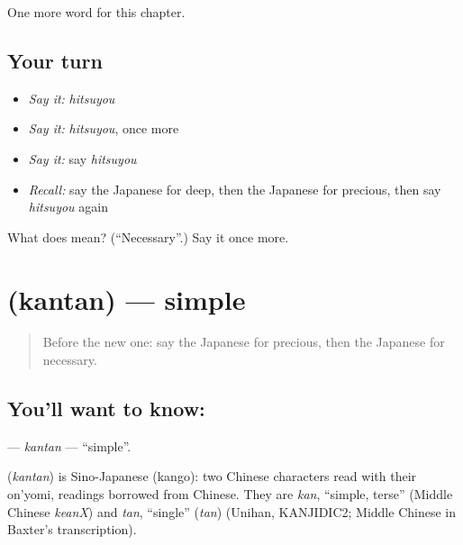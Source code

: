 \begin{grammarlens}[title={What you've built}]
One more word for this chapter.
\end{grammarlens}

\subsection*{Your turn}
\begin{itemize}
\raggedright
  \item \emph{Say it:} \emph{hitsuyou}
  \item \emph{Say it:} \emph{hitsuyou}, once more
  \item \emph{Say it:} say \emph{hitsuyou}
  \item \emph{Recall:} say the Japanese for deep, then the Japanese for precious, then say \emph{hitsuyou} again
\end{itemize}

\begin{tcolorbox}[breakable,colback=teal!4,colframe=teal!35!black,title={Before you move on}]
What does  mean? (\textquotedblleft{}Necessary\textquotedblright{}.) Say it once more.
\end{tcolorbox}
\section[\texorpdfstring{\ja{かんたん} (kantan)}{かんたん (kantan)}]{ (kantan) — simple}

\label{lesson:JA-C122-kantan}



\begin{quote}
Before the new one: say the Japanese for precious, then the Japanese for necessary.
\end{quote}

\subsection*{You'll want to know: }
\textbf{} — \emph{kantan} — \textquotedblleft{}simple\textquotedblright{}.

\begin{cousinweb}
\textbf{} (\emph{kantan}) is Sino-Japanese (kango): two Chinese characters read with their on'yomi, readings borrowed from Chinese. They are \emph{kan}, \textquotedblleft{}simple, terse\textquotedblright{} (Middle Chinese \emph{keanX}) and \emph{tan}, \textquotedblleft{}single\textquotedblright{} (\emph{tan}) (Unihan, KANJIDIC2; Middle Chinese in Baxter's transcription).
\end{cousinweb}

